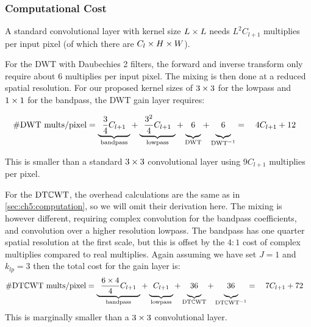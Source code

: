 \subsubsection{Computational Cost}\label{sec:ch6:computation}
A standard convolutional layer with kernel size $L\times L$ needs $L^2C_{l+1}$
multiplies per input pixel (of which there are $C_{l}\times H\times W$).

For the DWT with Daubechies 2 filters, the forward and inverse transform only
require about $6$ multiplies per input pixel. The mixing is then done at a
reduced spatial resolution. For our proposed kernel sizes of $3\times 3$ for the
lowpass and $1\times 1$ for the bandpass, the DWT gain layer requires:

\begin{equation}
  \text{\#DWT mults/pixel} = \underbrace{\hphantom{1} \frac{3}{4}C_{l+1} \hphantom{1}}_{\textrm{bandpass}} +
  \underbrace{\hphantom{1}\vphantom{\frac{3}{4}} \frac{3^2}{4} C_{l+1} \hphantom{1}}_{\textrm{lowpass}} + 
  \underbrace{\vphantom{\frac{3}{4}} 6}_{\text{DWT}} + 
  \underbrace{\vphantom{\frac{3}{4}} 6}_{\text{DWT}^{-1}} = \quad 4C_{l+1} + 12 \quad
  \label{eq:ch6:comp_dwt}
\end{equation}

This is smaller than a standard $3\times 3$ convolutional layer using $9C_{l+1}$
multiplies per pixel.

For the $\mathrm{DT}\mathbb{C}\mathrm{WT}$, the overhead calculations are the same as in
\autoref{sec:ch5:computation}, so we will omit their derivation here. The mixing
is however different, requiring complex convolution for the bandpass
coefficients, and convolution over a higher resolution lowpass. The bandpass has
one quarter spatial resolution at the first scale, but this is offset by the
$4:1$ cost of complex multiplies compared to real multiplies. Again assuming we
have set $J=1$ and $k_{lp} = 3$ then the total cost for the gain layer is:
%
\begin{equation}
  \text{\#$\DTCWT$ mults/pixel} = \underbrace{\hphantom{1} \frac{6\x 4}{4}C_{l+1} \hphantom{1}}_{\textrm{bandpass}} +
  \underbrace{\hphantom{1}\vphantom{\frac{6}{4}} C_{l+1} \hphantom{1}}_{\textrm{lowpass}} + 
  \underbrace{\vphantom{\frac{6}{4}} 36}_{\DTCWT} + 
  \underbrace{\vphantom{\frac{6}{4}} 36}_{\DTCWT^{-1}} = \quad 7C_{l+1} + 72 \quad
  \label{eq:ch6:comp_dtcwt}
\end{equation}
This is marginally smaller than a $3\times 3$ convolutional layer.

